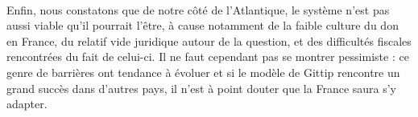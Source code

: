 \paragraph{}
Enfin, nous constatons que de notre côté de l'Atlantique, le système n'est pas
aussi viable qu'il pourrait l'être, à cause notamment de la faible culture du
don en France, du relatif vide juridique autour de la question, et des
difficultés fiscales rencontrées du fait de celui-ci. Il ne faut cependant pas
se montrer pessimiste : ce genre de barrières ont tendance à évoluer et si le
modèle de Gittip rencontre un grand succès dans d'autres pays, il n'est à
point douter que la France saura s'y adapter.
